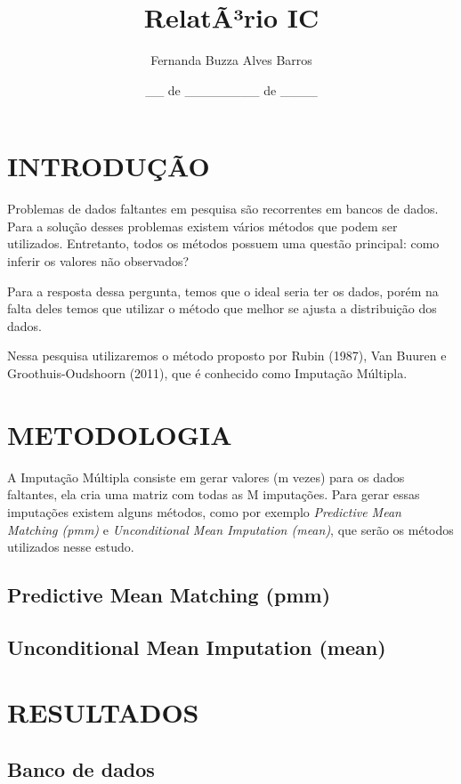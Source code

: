 \documentclass[]{article}
\title{RelatÃ³rio IC}
\author{Fernanda Buzza Alves Barros}
\date{\_\_ de \_\_\_\_\_\_\_\_ de \_\_\_\_}
\begin{document}
\maketitle

\section{INTRODUÇÃO}\label{introducao}

Problemas de dados faltantes em pesquisa são recorrentes em bancos de
dados. Para a solução desses problemas existem vários métodos que podem
ser utilizados. Entretanto, todos os métodos possuem uma questão
principal: como inferir os valores não observados?

Para a resposta dessa pergunta, temos que o ideal seria ter os dados,
porém na falta deles temos que utilizar o método que melhor se ajusta a
distribuição dos dados.

Nessa pesquisa utilizaremos o método proposto por Rubin (1987), Van
Buuren e Groothuis-Oudshoorn (2011), que é conhecido como Imputação
Múltipla.

\section{METODOLOGIA}\label{metodologia}

A Imputação Múltipla consiste em gerar valores (m vezes) para os dados
faltantes, ela cria uma matriz com todas as M imputações. Para gerar
essas imputações existem alguns métodos, como por exemplo
\emph{Predictive Mean Matching (pmm)} e \emph{Unconditional Mean
Imputation (mean)}, que serão os métodos utilizados nesse estudo.

\subsection{Predictive Mean Matching
(pmm)}\label{predictive-mean-matching-pmm}

\subsection{Unconditional Mean Imputation
(mean)}\label{unconditional-mean-imputation-mean}

\section{RESULTADOS}\label{resultados}

\subsection{Banco de dados}\label{banco-de-dados}
\end{document}
